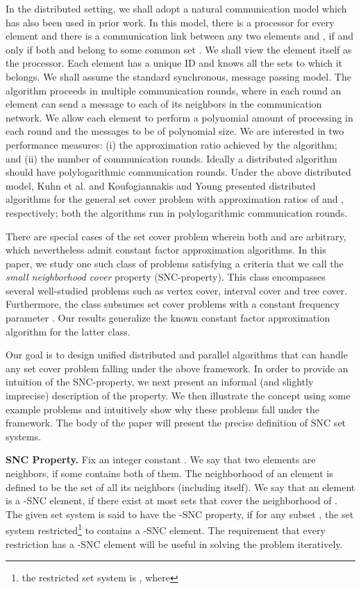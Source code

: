 \documentclass[11pt]{article}
\begin{document}
In the distributed setting, we shall adopt a natural communication model which has also been used in prior work.
In this model, there is a processor for every element 
and there is a communication link between any two elements  and ,
if and only if both  and  belong to some common set .
We shall view the element itself as the processor.
Each element has a unique ID and knows all the sets to which it belongs.
We shall assume the standard synchronous, message passing model.
The algorithm proceeds in multiple communication rounds, where in each round
an element can send a message to each of its neighbors in the communication network.
We allow each element to perform a polynomial amount of processing in each round
and the messages to be of polynomial size.
We are interested in two performance measures: 
(i) the approximation ratio achieved by the algorithm; and
(ii) the number of communication rounds. 
Ideally a distributed algorithm should have polylogarithmic communication rounds.
Under the above distributed model, Kuhn et al. \cite{near-sighted} and 
Koufogiannakis and Young \cite{Kouf-Young} presented distributed algorithms for the general set cover problem
with approximation ratios of  and , respectively;
both the algorithms run in polylogarithmic communication rounds.

There are special cases of the set cover problem wherein both  and  are arbitrary,
which nevertheless admit constant factor approximation algorithms.
In this paper, we study one such class of problems satisfying a criteria that we call the  
{\em small neighborhood cover} property (SNC-property).
This class encompasses several well-studied problems such as 
vertex cover, interval cover and tree cover.
Furthermore, the class subsumes set cover problems with a constant frequency parameter .
Our results generalize the known constant factor approximation algorithm for the latter class.

Our goal is to design unified distributed and parallel algorithms
that can handle any set cover problem falling under the above framework.
In order to provide an intuition of the SNC-property,
we next present an informal (and slightly imprecise) description of the property.
We then illustrate the concept using some example problems and intuitively show why these
problems fall under the framework.
The body of the paper will present the precise definition of SNC set systems. 

{\bf SNC Property.}
Fix an integer constant . We say that two elements are neighbors, if some 
contains both of them. The neighborhood of an element is defined to be the set of all its neighbors (including itself).
We say that an element  is a -SNC element,
if there exist at most  sets that cover the neighborhood of .
The given set system is said to have the -SNC property, 
if for any subset , the set system restricted\footnote{the restricted set system is , 
where } to  contains a -SNC element.
The requirement that every restriction has a -SNC element will be useful in solving the problem iteratively.
\end{document}
